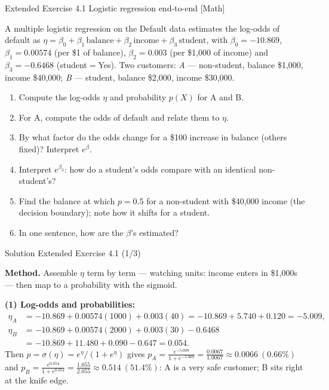 \documentclass[aspectratio=169,11pt]{beamer}
\begin{document}
\begin{frame}{Extended Exercise 4.1 \textemdash{} Logistic regression end-to-end [Math]}
\begin{longexercise}
A multiple logistic regression on the Default data estimates the log-odds
of default as
$\eta=\beta_0+\beta_1\,\text{balance}+\beta_2\,\text{income}
      +\beta_3\,\text{student}$, with
$\beta_0=-10.869$, $\beta_1=0.00574$ (per \$1 of balance),
$\beta_2=0.003$ (per \$1{,}000 of income) and
$\beta_3=-0.6468$ (student${}={}$Yes). Two customers:
\emph{A} --- non-student, balance \$1{,}000, income \$40{,}000;\quad
\emph{B} --- student, balance \$2{,}000, income \$30{,}000.
\begin{enumerate}
  \item Compute the log-odds $\eta$ and probability $p(X)$ for A and B.
  \item For A, compute the odds of default and relate them to $\eta$.
  \item By what factor do the odds change for a \$100 increase in balance
        (others fixed)? Interpret $e^{\beta}$.
  \item Interpret $e^{\beta_3}$: how do a student's odds compare with an
        identical non-student's?
  \item Find the balance at which $p=0.5$ for a non-student with
        \$40{,}000 income (the decision boundary); note how it shifts for
        a student.
  \item In one sentence, how are the $\beta$'s estimated?
\end{enumerate}
\end{longexercise}
\end{frame}

\begin{frame}{Solution \textemdash{} Extended Exercise 4.1 (1/3)}
\begin{solutionbox}
\textbf{Method.} Assemble $\eta$ term by term --- watching units:
income enters in \$1{,}000s --- then map to a probability with the
sigmoid.

\vspace{1mm}
\textbf{(1) Log-odds and probabilities:}
\[
\begin{aligned}
  \eta_A&=-10.869+0.00574(1000)+0.003(40)
         =-10.869+5.740+0.120=-5.009,\\
  \eta_B&=-10.869+0.00574(2000)+0.003(30)-0.6468\\
        &=-10.869+11.480+0.090-0.647=0.054.
\end{aligned}
\]
Then $p=\sigma(\eta)=e^{\eta}/(1+e^{\eta})$ gives
$p_A=\tfrac{e^{-5.009}}{1+e^{-5.009}}=\tfrac{0.0067}{1.0067}
\approx 0.0066\ (0.66\%)$ and
$p_B=\tfrac{e^{0.054}}{1+e^{0.054}}=\tfrac{1.055}{2.055}
\approx 0.514\ (51.4\%)$: A is a very safe customer; B sits right at
the knife edge.
\end{solutionbox}
\end{frame}
\end{document}
